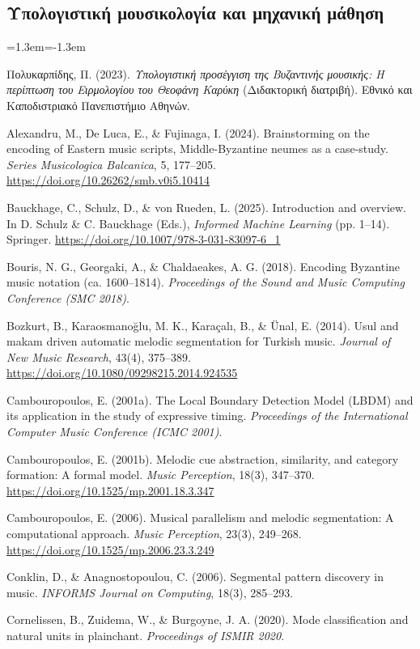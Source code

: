 \documentclass[a4paper]{article}
\newenvironment{reflist}{\begin{list}{}{\leftmargin=1.3em\itemindent=-1.3em\itemsep=0pt\parsep=0pt}\fontsize{9}{9.5}\selectfont}{\end{list}}
\begin{document}
\subsection*{Υπολογιστική μουσικολογία και μηχανική μάθηση}
\begin{reflist}
\item Πολυκαρπίδης, Π. (2023). \emph{Υπολογιστική προσέγγιση της Βυζαντινής μουσικής: Η περίπτωση του Ειρμολογίου του Θεοφάνη Καρύκη} (Διδακτορική διατριβή). Εθνικό και Καποδιστριακό Πανεπιστήμιο Αθηνών.
\item Alexandru, M., De Luca, E., \& Fujinaga, I. (2024). Brainstorming on the encoding of Eastern music scripts, Middle-Byzantine neumes as a case-study. \emph{Series Musicologica Balcanica}, 5, 177--205. \url{https://doi.org/10.26262/smb.v0i5.10414}
\item Bauckhage, C., Schulz, D., \& von Rueden, L. (2025). Introduction and overview. In D. Schulz \& C. Bauckhage (Eds.), \emph{Informed Machine Learning} (pp. 1--14). Springer. \url{https://doi.org/10.1007/978-3-031-83097-6_1}
\item Bouris, N. G., Georgaki, A., \& Chaldaeakes, A. G. (2018). Encoding Byzantine music notation (ca. 1600--1814). \emph{Proceedings of the Sound and Music Computing Conference (SMC 2018)}.
\item Bozkurt, B., Karaosmanoğlu, M. K., Karaçalı, B., \& Ünal, E. (2014). Usul and makam driven automatic melodic segmentation for Turkish music. \emph{Journal of New Music Research}, 43(4), 375--389. \url{https://doi.org/10.1080/09298215.2014.924535}
\item Cambouropoulos, E. (2001a). The Local Boundary Detection Model (LBDM) and its application in the study of expressive timing. \emph{Proceedings of the International Computer Music Conference (ICMC 2001)}.
\item Cambouropoulos, E. (2001b). Melodic cue abstraction, similarity, and category formation: A formal model. \emph{Music Perception}, 18(3), 347--370. \url{https://doi.org/10.1525/mp.2001.18.3.347}
\item Cambouropoulos, E. (2006). Musical parallelism and melodic segmentation: A computational approach. \emph{Music Perception}, 23(3), 249--268. \url{https://doi.org/10.1525/mp.2006.23.3.249}
\item Conklin, D., \& Anagnostopoulou, C. (2006). Segmental pattern discovery in music. \emph{INFORMS Journal on Computing}, 18(3), 285--293.
\item Cornelissen, B., Zuidema, W., \& Burgoyne, J. A. (2020). Mode classification and natural units in plainchant. \emph{Proceedings of ISMIR 2020}.

\end{reflist}
\end{document}
